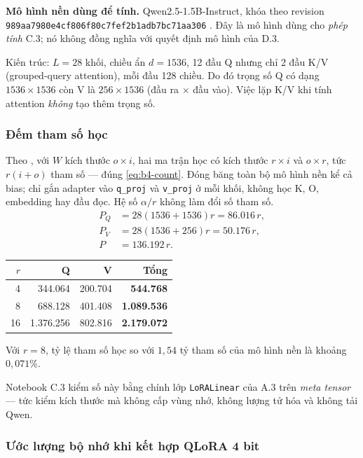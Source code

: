 \textbf{Mô hình nền dùng để tính.} Qwen2.5-1.5B-Instruct, khóa theo revision
\texttt{989aa7980e4cf806f80c7fef2b1adb7bc71aa306} \cite{qwen}. Đây là mô hình dùng
cho \emph{phép tính} C.3; nó không đồng nghĩa với quyết định mô hình của D.3.

Kiến trúc: $L=28$ khối, chiều ẩn $d=1536$, 12 đầu Q nhưng chỉ 2 đầu K/V
(grouped-query attention), mỗi đầu 128 chiều. Do đó trọng số Q có dạng
$1536\times1536$ còn V là $256\times1536$ (đầu ra $\times$ đầu vào). Việc lặp K/V
khi tính attention \emph{không} tạo thêm trọng số.

\subsubsection{Đếm tham số học}

Theo \cite[§4.1]{lora}, với $W$ kích thước $o\times i$, hai ma trận học có kích
thước $r\times i$ và $o\times r$, tức $r(i+o)$ tham số --- đúng
\eqref{eq:b4-count}. Đóng băng toàn bộ mô hình nền kể cả bias; chỉ gắn adapter vào
\texttt{q\_proj} và \texttt{v\_proj} ở mỗi khối, không học K, O, embedding hay đầu
đọc. Hệ số $\alpha/r$ không làm đổi số tham số.
\begin{align*}
  P_Q&=28(1536+1536)r=86{.}016\,r,\\
  P_V&=28(1536+256)r=50{.}176\,r,\\
  P&=136{.}192\,r.
\end{align*}

\begin{center}
\begin{tabular}{rrrr}
\toprule
$r$ & \textbf{Q} & \textbf{V} & \textbf{Tổng}\\
\midrule
4 & 344.064 & 200.704 & \textbf{544.768}\\
8 & 688.128 & 401.408 & \textbf{1.089.536}\\
16 & 1.376.256 & 802.816 & \textbf{2.179.072}\\
\bottomrule
\end{tabular}
\end{center}

Với $r=8$, tỷ lệ tham số học so với $1{,}54$ tỷ tham số của mô hình nền là khoảng
$0{,}071\%$.

Notebook C.3 kiểm số này bằng chính lớp \texttt{LoRALinear} của A.3 trên
\emph{meta tensor} --- tức kiểm kích thước mà không cấp vùng nhớ, không lượng tử
hóa và không tải Qwen.

\subsubsection{Ước lượng bộ nhớ khi kết hợp QLoRA 4 bit}

